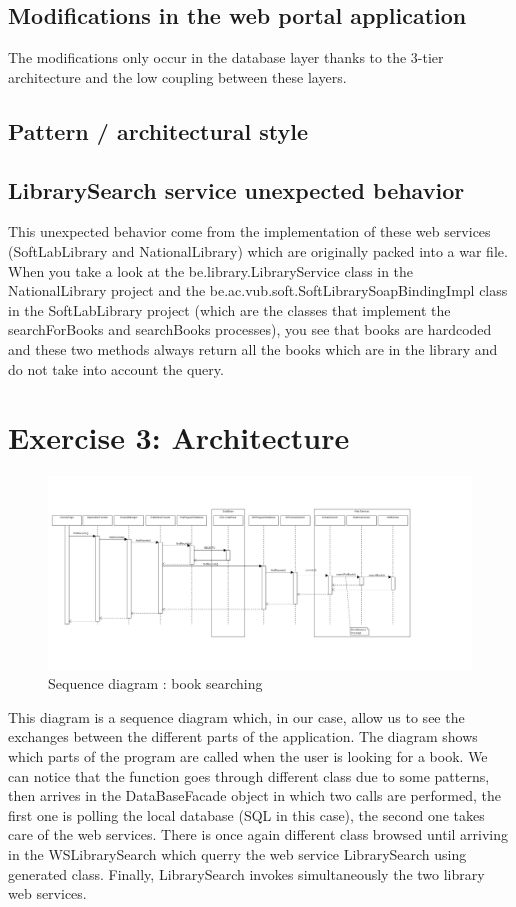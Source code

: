 \documentclass[a4paper,10pt]{article}
\begin{document}
\subsection{Modifications in the web portal application}
The modifications only occur in the database layer thanks to the 3-tier architecture and the low coupling between these layers.

\subsection{Pattern / architectural style}

\subsection{LibrarySearch service unexpected behavior}
This unexpected behavior come from the implementation of these web services (SoftLabLibrary and NationalLibrary) which are originally packed into a war file. When you take a look at the be.library.LibraryService class in the NationalLibrary project and the be.ac.vub.soft.SoftLibrarySoapBindingImpl class in the SoftLabLibrary project (which are the classes that implement the searchForBooks and searchBooks processes), you see that books are hardcoded and these two methods always return all the books which are in the library and do not take into account the query.


\section{Exercise 3: Architecture}
\clearpage
\begin{landscape}
\begin{figure}[h]
   \includegraphics[scale=0.4]{uml/sequence.png}
   \caption{\label{sequence} Sequence diagram : book searching}
\end{figure}
\end{landscape}
This diagram is a sequence diagram which, in our case, allow us to see the exchanges between the different parts of the application. The diagram shows which parts of the program are called when the user is looking for a book. We can notice that the function goes through different class due to some patterns, then arrives in the DataBaseFacade object in which two calls are performed, the first one is polling the local database (SQL in this case), the second one takes care of the web services. There is once again different class browsed until arriving in the WSLibrarySearch which querry the web service LibrarySearch using generated class. Finally, LibrarySearch invokes simultaneously the two library web services.
\end{document}
